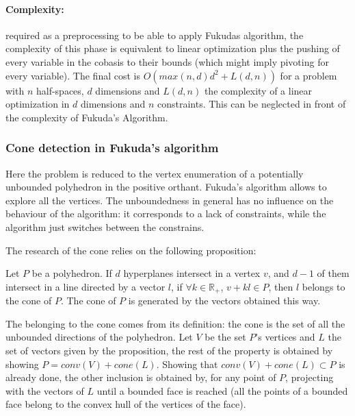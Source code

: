 \paragraph{Complexity:} required as a preprocessing to be able to apply Fukudas algorithm, the complexity of this phase is equivalent to linear optimization plus the pushing of every variable in the cobasis to their bounds (which might imply pivoting for every variable). The final cost is $O(max(n,d)d^2+L(d,n))$ for a problem with $n$ half-spaces, $d$ dimensions and $L(d,n)$ the complexity of a linear optimization in $d$ dimensions and $n$ constraints. This can be neglected in front of the complexity of Fukuda's Algorithm.

\subsubsection{Cone detection in Fukuda's algorithm}

Here the problem is reduced to the vertex enumeration of a potentially unbounded polyhedron in the positive orthant. Fukuda's algorithm allows to explore all the vertices. The unboundedness in general has no influence on the behaviour of the algorithm: it corresponds to a lack of constraints, while the algorithm just switches between the constrains.

The research of the cone relies on the following proposition:
\begin{proposition}
Let $P$ be a polyhedron. If $d$ hyperplanes intersect in a vertex $v$, and $d-1$ of them intersect in a line directed by a vector $l$, if $\forall k\in \mathbb{R}_+$, $v+kl\in P$, then $l$ belongs to the cone of $P$. The cone of $P$ is generated by the vectors obtained this way.
\label{prop_cone}
\end{proposition}

The belonging to the cone comes from its definition: the cone is the set of all the unbounded directions of the polyhedron. Let $V$ be the set $P$'s vertices and $L$ the set of vectors given by the proposition, the rest of the property is obtained by showing $P=conv(V)+cone(L)$. Showing that $conv(V)+cone(L)\subset P$ is already done, the other inclusion is obtained by, for any point of $P$, projecting with the vectors of $L$ until a bounded face is reached (all the points of a bounded face belong to the convex hull of the vertices of the face).

